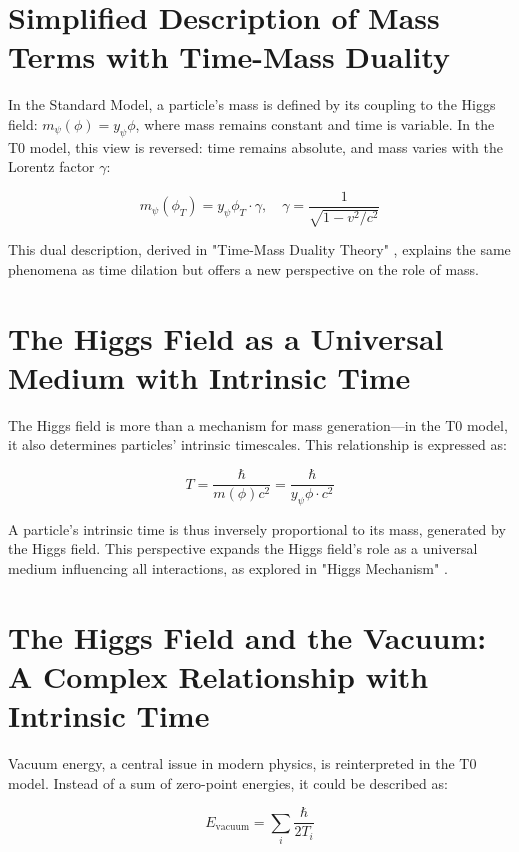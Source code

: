 \documentclass[a4paper,12pt]{article}
\begin{document}
	\section{Simplified Description of Mass Terms with Time-Mass Duality}
	
	In the Standard Model, a particle’s mass is defined by its coupling to the Higgs field: \(m_\psi(\phi) = y_\psi \phi\), where mass remains constant and time is variable. In the T0 model, this view is reversed: time remains absolute, and mass varies with the Lorentz factor \(\gamma\):
	
	\begin{equation}
		m_\psi(\phi_T) = y_\psi \phi_T \cdot \gamma, \quad \gamma = \frac{1}{\sqrt{1 - v^2/c^2}}
	\end{equation}
	
	This dual description, derived in "Time-Mass Duality Theory" \cite{pascher_params_2025}, explains the same phenomena as time dilation but offers a new perspective on the role of mass.
	
	\section{The Higgs Field as a Universal Medium with Intrinsic Time}
	
	The Higgs field is more than a mechanism for mass generation—in the T0 model, it also determines particles’ intrinsic timescales. This relationship is expressed as:
	
	\begin{equation}
		T = \frac{\hbar}{m(\phi) c^2} = \frac{\hbar}{y_\psi \phi \cdot c^2}
	\end{equation}
	
	A particle’s intrinsic time is thus inversely proportional to its mass, generated by the Higgs field. This perspective expands the Higgs field’s role as a universal medium influencing all interactions, as explored in "Higgs Mechanism" \cite{pascher_higgs_2025}.
	
	\section{The Higgs Field and the Vacuum: A Complex Relationship with Intrinsic Time}
	
	Vacuum energy, a central issue in modern physics, is reinterpreted in the T0 model. Instead of a sum of zero-point energies, it could be described as:
	
	\begin{equation}
		E_\text{vacuum} = \sum_i \frac{\hbar}{2 T_i}
	\end{equation}
	
\end{document}
